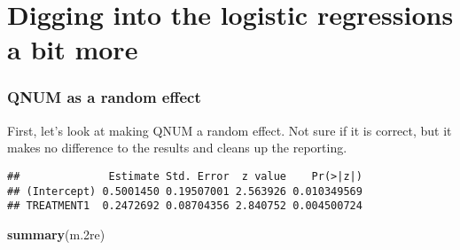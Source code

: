 \documentclass[]{article}
\newenvironment{Shaded}{\begin{snugshade}}{\end{snugshade}}
\newcommand{\KeywordTok}[1]{\textcolor[rgb]{0.13,0.29,0.53}{\textbf{#1}}}
\newcommand{\DataTypeTok}[1]{\textcolor[rgb]{0.13,0.29,0.53}{#1}}
\newcommand{\DecValTok}[1]{\textcolor[rgb]{0.00,0.00,0.81}{#1}}
\newcommand{\StringTok}[1]{\textcolor[rgb]{0.31,0.60,0.02}{#1}}
\newcommand{\OperatorTok}[1]{\textcolor[rgb]{0.81,0.36,0.00}{\textbf{#1}}}
\newcommand{\NormalTok}[1]{#1}
\begin{document}
\section{Digging into the logistic regressions a bit
more}\label{digging-into-the-logistic-regressions-a-bit-more}

\subsubsection{QNUM as a random effect}\label{qnum-as-a-random-effect}

First, let's look at making QNUM a random effect. Not sure if it is
correct, but it makes no difference to the results and cleans up the
reporting.

\begin{Shaded}
\end{Shaded}

\begin{verbatim}
##              Estimate Std. Error  z value    Pr(>|z|)
## (Intercept) 0.5001450 0.19507001 2.563926 0.010349569
## TREATMENT1  0.2472692 0.08704356 2.840752 0.004500724
\end{verbatim}

\begin{Shaded}
\begin{Highlighting}[]
\KeywordTok{summary}\NormalTok{(m.2re)}
\end{Highlighting}
\end{Shaded}
\end{document}
